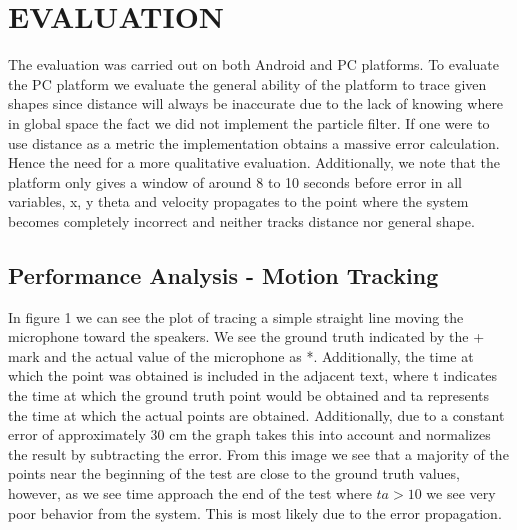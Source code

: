 \documentclass{acm_proc_article-sp}
\begin{document}
\section{EVALUATION} \label{evaluation}
The evaluation was carried out on both Android and PC platforms. To evaluate the PC platform we evaluate the general ability of the platform to trace given shapes since distance will always be inaccurate due to the lack of knowing where in global space the fact we did not implement the particle filter. If one were to use distance as a metric the implementation obtains a massive error calculation. Hence the need for a more qualitative evaluation. Additionally, we note that the platform only gives a window of around 8 to 10 seconds before error in all variables, x, y theta and velocity propagates to the point where the system becomes completely incorrect and neither tracks distance nor general shape.

\subsection{Performance Analysis - Motion Tracking}
In figure 1 we can see the plot of tracing a simple straight line moving the microphone toward the speakers. We see the ground truth indicated by the + mark and the actual value of the microphone as *. Additionally, the time at which the point was obtained is included in the adjacent text, where t indicates the time at which the ground truth point would be obtained and ta represents the time at which the actual points are obtained. Additionally, due to a constant error of approximately 30 cm the graph takes this into account and normalizes the result by subtracting the error. From this image we see that a majority of the points near the beginning of the test are close to the ground truth values, however, as we see time approach the end of the test where $ta > 10$ we see very poor behavior from the system. This is most likely due to the error propagation.
\end{document}
